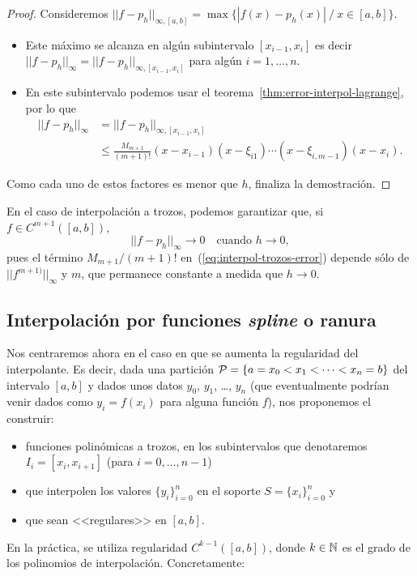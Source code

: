  \begin{proof}
   Consideremos $||f-p_h||_{\infty, [a,b]}=\max\{ |f(x)-p_h(x)|\ /\
   x\in[a,b]\}$.
   \begin{itemize}
   \item Este máximo se alcanza en algún subintervalo $[x_{i-1},x_{i}]$
     es decir $||f-p_h||_{\infty}=||f-p_h||_{\infty, [x_{i-1},x_i]}$
     para algún $i=1,\dots,n$.
   \item En este subintervalo podemos usar el
     teorema~\ref{thm:error-interpol-lagrange}, por lo que
     \begin{align*}
       ||f-p_h||_\infty &= ||f-p_h||_{\infty, [x_{i-1},x_i]}  \\
       &\le\frac{M_{m+1}}{(m+1)!}
       (x-x_{i-1})(x-\xi_{i1})\cdots(x-\xi_{i,m-1})(x-x_i).
     \end{align*}
   \end{itemize}
   Como cada uno de estos factores es menor que $h$, finaliza la
   demostración.
 \end{proof}

 \begin{remark}
   \label{rk:3}
   En el caso de interpolación a trozos, podemos garantizar que, si
   $f\in C^{m+1}([a,b])$,
   \begin{equation*}
     ||f-p_h||_\infty \to 0 \quad \text{cuando } h \to 0,
   \end{equation*}
   pues el término $M_{m+1}/(m+1)!$ en~(\ref{eq:interpol-trozos-error})
   depende sólo de $||f^{m+1)}||_\infty$ y $m$, que permanece constante
   a medida que $h\to 0$.
 \end{remark}

 \subsection{Interpolación por funciones \textit{spline} o ranura}
 \label{sec:splines}

 Nos centraremos ahora en
 el caso en que se aumenta la regularidad del interpolante.
 Es decir, dada una partición 
 ${\cal P}= \{a = x_0 <x_1 < \cdots <x_n=b\}$
 del intervalo $[a,b]$ y dados unos datos $y_0$, $y_1$, \dots, $y_n$
 (que eventualmente podrían venir dados como $y_i=f(x_i)$ para alguna
 función $f$), nos proponemos el construir:
 \begin{itemize}
 \item  funciones polinómicas a trozos, en los subintervalos que
   denotaremos $I_i=[x_{i},x_{i+1}]$ (para $ i=0,\dots,n-1$)
 \item que interpolen los valores $\{y_i\}_{i=0}^n$ en el soporte
   $S=\{x_i\}_{i=0}^n$ y
 \item que sean <<regulares>> en $[a,b]$.
 \end{itemize}
 En la práctica, se utiliza regularidad $C^{k-1}([a,b])$, donde
 $k\in\operatorname{{\mathbb N}}$ es el grado de los polinomios de
 interpolación. Concretamente:%

